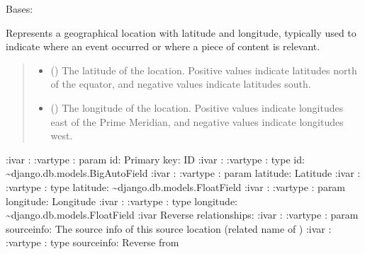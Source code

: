 \documentclass[letterpaper,10pt,english]{sphinxmanual}
\begin{document}
\begin{fulllineitems}
\label{\detokenize{source/meta_models_management:meta_models_management.models.SourceLocation}}
\pysigstartsignatures
{}
\pysigstopsignatures
\sphinxAtStartPar
Bases: 

\sphinxAtStartPar
Represents a geographical location with latitude and longitude, typically used to indicate where an event occurred or where a piece of content is relevant.
\begin{quote}\begin{description}
\begin{itemize}
\item {} 
\sphinxAtStartPar
{} () \textendash{} The latitude of the location. Positive values indicate latitudes north of the equator, and negative values indicate latitudes south.

\item {} 
\sphinxAtStartPar
{} () \textendash{} The longitude of the location. Positive values indicate longitudes east of the Prime Meridian, and negative values indicate longitudes west.

\end{itemize}

\end{description}\end{quote}

\sphinxAtStartPar
:ivar : 
:vartype : param id: Primary key: ID
:ivar : 
:vartype : type id: \textasciitilde{}django.db.models.BigAutoField
:ivar : 
:vartype : param latitude: Latitude
:ivar : 
:vartype : type latitude: \textasciitilde{}django.db.models.FloatField
:ivar : 
:vartype : param longitude: Longitude
:ivar :
:vartype : type longitude: \textasciitilde{}django.db.models.FloatField
:ivar Reverse relationships:
:ivar : 
:vartype : param sourceinfo: The source info of this source location (related name of )
:ivar : 
:vartype : type sourceinfo: Reverse  from {\hyperref[\detokenize{source/meta_models_management:meta_models_management.models.SourceInfo}]{}}


\end{fulllineitems}
\end{document}
